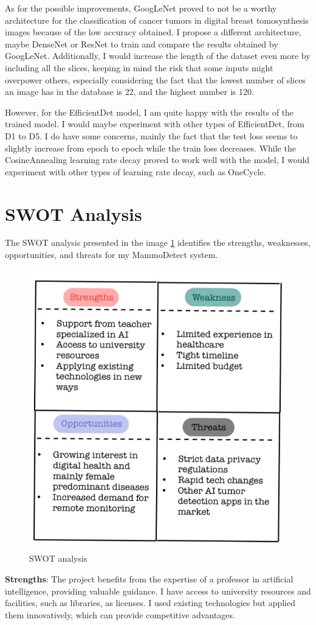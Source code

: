 As for the possible improvements, GoogLeNet proved to not be a worthy architecture for the classification of cancer tumors in digital breast tomosynthesis images because of the low accuracy obtained. I propose a different architecture, maybe DenseNet or ResNet to train and compare the results obtained by GoogLeNet. Additionally, I would increase the length of the dataset even more by including all the slices, keeping in mind the risk that some inputs might overpower others, especially considering the fact that the lowest number of slices an image has in the database is 22, and the highest number is 120.

However, for the EfficientDet model, I am quite happy with the results of the trained model. I would maybe experiment with other types of EfficientDet, from D1 to D5. I do have some concerns, mainly the fact that the test loss seems to slightly increase from epoch to epoch while the train loss decreases. While the CosineAnnealing learning rate decay proved to work well with the model, I would experiment with other types of learning rate decay, such as OneCycle.

\section{SWOT Analysis}

The SWOT analysis presented in the image \ref{fig:fig44} identifies the strengths, weaknesses, opportunities, and threats for my MammoDetect system.

\begin{figure}[H]
    \centering
    \includegraphics[width=0.5\linewidth]{figures/Figure54.png}
    \caption{SWOT analysis}
    \label{fig:fig44}
\end{figure}

\textbf{Strengths}:
The project benefits from the expertise of a professor in artificial intelligence, providing valuable guidance. I have access to university resources and facilities, such as libraries, as licenses. I used existing technologies but applied them innovatively, which can provide competitive advantages.

